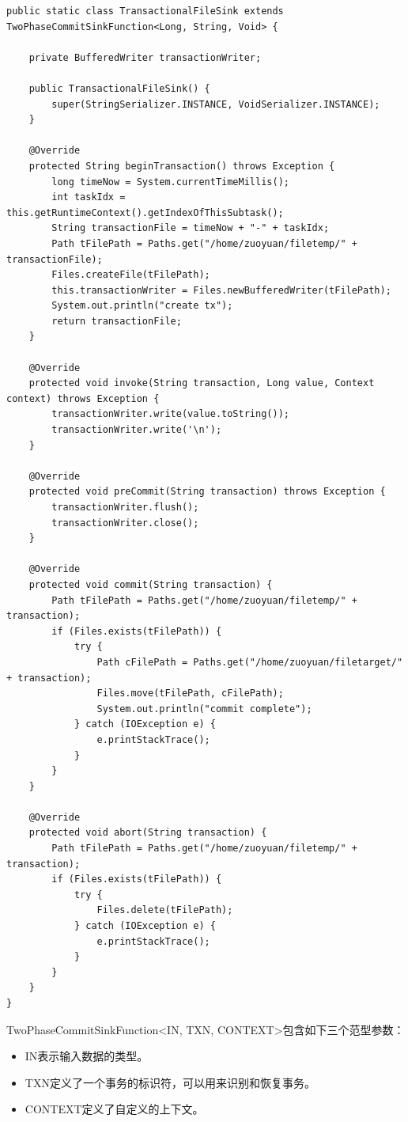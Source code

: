 \documentclass[cn,11pt,chinese]{elegantbook}
\begin{document}
\begin{verbatim}
public static class TransactionalFileSink extends TwoPhaseCommitSinkFunction<Long, String, Void> {

    private BufferedWriter transactionWriter;

    public TransactionalFileSink() {
        super(StringSerializer.INSTANCE, VoidSerializer.INSTANCE);
    }

    @Override
    protected String beginTransaction() throws Exception {
        long timeNow = System.currentTimeMillis();
        int taskIdx = this.getRuntimeContext().getIndexOfThisSubtask();
        String transactionFile = timeNow + "-" + taskIdx;
        Path tFilePath = Paths.get("/home/zuoyuan/filetemp/" + transactionFile);
        Files.createFile(tFilePath);
        this.transactionWriter = Files.newBufferedWriter(tFilePath);
        System.out.println("create tx");
        return transactionFile;
    }

    @Override
    protected void invoke(String transaction, Long value, Context context) throws Exception {
        transactionWriter.write(value.toString());
        transactionWriter.write('\n');
    }

    @Override
    protected void preCommit(String transaction) throws Exception {
        transactionWriter.flush();
        transactionWriter.close();
    }

    @Override
    protected void commit(String transaction) {
        Path tFilePath = Paths.get("/home/zuoyuan/filetemp/" + transaction);
        if (Files.exists(tFilePath)) {
            try {
                Path cFilePath = Paths.get("/home/zuoyuan/filetarget/" + transaction);
                Files.move(tFilePath, cFilePath);
                System.out.println("commit complete");
            } catch (IOException e) {
                e.printStackTrace();
            }
        }
    }

    @Override
    protected void abort(String transaction) {
        Path tFilePath = Paths.get("/home/zuoyuan/filetemp/" + transaction);
        if (Files.exists(tFilePath)) {
            try {
                Files.delete(tFilePath);
            } catch (IOException e) {
                e.printStackTrace();
            }
        }
    }
}
\end{verbatim}

TwoPhaseCommitSinkFunction<IN, TXN, CONTEXT>包含如下三个范型参数：

\begin{itemize}
    \item IN表示输入数据的类型。
    \item TXN定义了一个事务的标识符，可以用来识别和恢复事务。
    \item CONTEXT定义了自定义的上下文。
\end{itemize}
\end{document}
